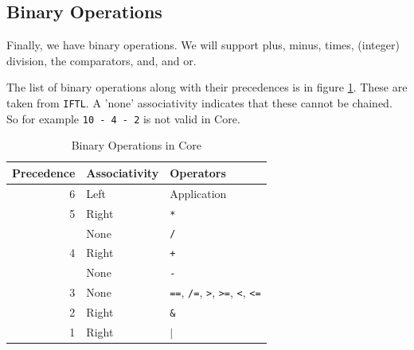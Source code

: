 \documentclass[11pt]{article}
\begin{document}
\subsection{Binary Operations}
\label{sec:org803c518}

Finally, we have binary operations.  We will support plus, minus, times, (integer) division, the comparators, and, and or.

The list of binary operations along with their precedences is in figure \ref{fig-binop}.  These are taken from \texttt{IFTL}.
A 'none' associativity indicates that these cannot be chained.  So for example \texttt{10 - 4 - 2} is not valid in Core.  

\begin{table}[htbp]
\caption{\label{fig-binop}Binary Operations in Core}
\centering
\begin{tabular}{rll}
Precedence & Associativity & Operators\\
\hline
6 & Left & Application\\
5 & Right & \texttt{*}\\
 & None & \texttt{/}\\
4 & Right & \texttt{+}\\
 & None & \texttt{-}\\
3 & None & \texttt{==}, \texttt{/=}, \texttt{>}, \texttt{>=}, \texttt{<}, \texttt{<=}\\
2 & Right & \texttt{\&}\\
1 & Right & \(\vert{}\)\\
\end{tabular}
\end{table}
\end{document}
